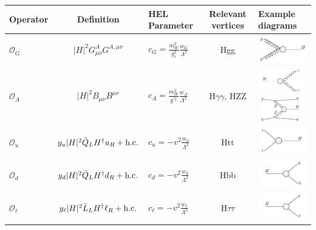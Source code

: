 \begin{tabular}{lcm{3cm}<{\centering}cm{4.5cm}<{\centering}}
    Operator & Definition & HEL Parameter & Relevant vertices & Example diagrams \\ \hline

    $\mathcal{O}_G$ & $|H|^2G^A_{\mu\nu}G^{A,\mu\nu}$ & $c_G=\frac{m_W^2}{g_s^2}\frac{w_G}{\Lambda^2}$ & Hgg & \vspace{.1cm}\includegraphics[width=2.5cm]{Figures/eft/eft_feynman/cG.pdf} \\

    $\mathcal{O}_A$ & $|H|^2B_{\mu\nu}B^{\mu\nu}$ & $c_A=\frac{m_W^2}{g^{'2}}\frac{w_A}{\Lambda^2}$ & H$\gamma\gamma$, HZZ & \vspace{.1cm}\includegraphics[width=2cm]{Figures/eft/eft_feynman/cA.pdf} \vspace{.1cm}\includegraphics[width=2cm]{Figures/eft/eft_feynman/cB.pdf} \\

    $\mathcal{O}_u$ & $y_u|H|^2\bar{Q}_LH^{\dagger}u_R + {\rm{h.c.}}$ & $c_u=-v^2\frac{w_u}{\Lambda^2}$ & Htt & \vspace{.1cm}\includegraphics[width=2.5cm]{Figures/eft/eft_feynman/cu.pdf} \\

    $\mathcal{O}_d$ & $y_d|H|^2\bar{Q}_LH^{\dagger}d_R + {\rm{h.c.}}$ & $c_d=-v^2\frac{w_d}{\Lambda^2}$ & Hbb & \vspace{.1cm}\includegraphics[width=2.5cm]{Figures/eft/eft_feynman/cd.pdf} \\

    $\mathcal{O}_\ell$ & $y_\ell|H|^2\bar{L}_LH^{\dagger}\ell_R + {\rm{h.c.}}$ & $c_\ell=-v^2\frac{w_\ell}{\Lambda^2}$ & H$\tau\tau$  & \vspace{.1cm}\includegraphics[width=2.5cm]{Figures/eft/eft_feynman/cl.pdf} \\


\end{tabular}
